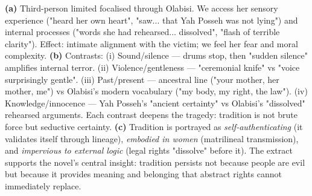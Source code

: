 \documentclass[11pt]{article}
\begin{document}
\begin{corrige}
\textbf{(a)} Third-person limited focalised through Olabisi. We access her sensory experience ("heard her own heart", "saw... that Yah Posseh was not lying") and internal processes ("words she had rehearsed... dissolved", "flash of terrible clarity"). Effect: intimate alignment with the victim; we feel her fear and moral complexity.
\textbf{(b)} Contrasts: (i) Sound/silence --- drums stop, then "sudden silence" amplifies internal terror. (ii) Violence/gentleness --- "ceremonial knife" vs "voice surprisingly gentle". (iii) Past/present --- ancestral line ("your mother, her mother, me") vs Olabisi's modern vocabulary ("my body, my right, the law"). (iv) Knowledge/innocence --- Yah Posseh's "ancient certainty" vs Olabisi's "dissolved" rehearsed arguments. Each contrast deepens the tragedy: tradition is not brute force but seductive certainty.
\textbf{(c)} Tradition is portrayed as \emph{self-authenticating} (it validates itself through lineage), \emph{embodied in women} (matrilineal transmission), and \emph{impervious to external logic} (legal rights "dissolve" before it). The extract supports the novel's central insight: tradition persists not because people are evil but because it provides meaning and belonging that abstract rights cannot immediately replace.
\end{corrige}
\end{document}
